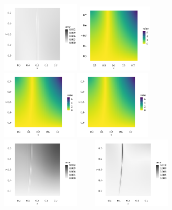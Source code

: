 \documentclass[a4paper,11pt]{article}
\numberwithin{equation}{section}
\theoremstyle{plain}
\theoremstyle{definition}
\begin{document}
\begin{figure}[h!]
\begin{center}
  \includegraphics[width=0.34\textwidth]{error_lrmc.pdf}
  \includegraphics[width=0.328\textwidth]{r_new.pdf}
  \includegraphics[width=0.328\textwidth]{r_mc_new.pdf}
   \includegraphics[width=0.328\textwidth]{r_lrmc_new.pdf}
     \includegraphics[width=0.34\textwidth]{error_mc_new.pdf}\ \ \ \ \ 
  \includegraphics[width=0.34\textwidth]{error_lrmc_new.pdf}

\end{center}
\end{figure}
\end{document}

